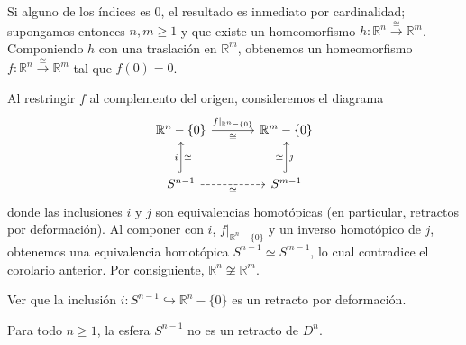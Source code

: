 \begin{dem}
Si alguno de los índices es $0$, el resultado es inmediato por cardinalidad; supongamos entonces $n, m \geq 1$ y que existe un homeomorfismo $h \colon \mathbb{R}^n \xrightarrow{\;\cong\;} \mathbb{R}^m$. Componiendo $h$ con una traslación en $\mathbb{R}^m$, obtenemos un homeomorfismo $f \colon \mathbb{R}^n \xrightarrow{\;\cong\;} \mathbb{R}^m$ tal que $f(0) = 0$.

Al restringir $f$ al complemento del origen, consideremos el diagrama
\[
\begin{tikzcd}[column sep=3.4em, row sep=2.5em]
\mathbb{R}^n - \{0\} \arrow[r, "f|_{\mathbb{R}^n - \{0\}}", "\cong"'] & \mathbb{R}^m - \{0\} \\
S^{n-1} \arrow[u, hook, "i", "\simeq"'] \arrow[r, dashed, "\simeq"'] & S^{m-1} \arrow[u, hook, "j"', "\simeq"]
\end{tikzcd}
\]
donde las inclusiones $i$ y $j$ son equivalencias homotópicas (en particular, retractos por deformación). Al componer con $i$, $f|_{\mathbb{R}^n - \{0\}}$ y un inverso homotópico de $j$, obtenemos una equivalencia homotópica $S^{n-1} \simeq S^{m-1}$, lo cual contradice el corolario anterior. Por consiguiente, $\mathbb{R}^n \not\cong \mathbb{R}^m$.
\end{dem}

\begin{ejercicio}
Ver que la inclusión $i \colon S^{n-1} \hookrightarrow \mathbb{R}^n - \{0\}$ es un retracto por deformación.
\end{ejercicio}

\begin{prop}
Para todo $n \geq 1$, la esfera $S^{n-1}$ no es un retracto de $D^n$.
\end{prop}

